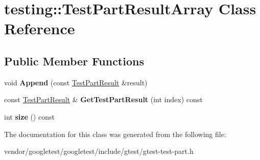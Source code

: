 \hypertarget{classtesting_1_1TestPartResultArray}{}\section{testing\+:\+:Test\+Part\+Result\+Array Class Reference}
\label{classtesting_1_1TestPartResultArray}
\subsection*{Public Member Functions}
\begin{DoxyCompactItemize}
\item 
void {\bfseries Append} (const \hyperlink{classtesting_1_1TestPartResult}{Test\+Part\+Result} \&result)\hypertarget{classtesting_1_1TestPartResultArray_a01844bd505b18a666324617a1b459558}{}\label{classtesting_1_1TestPartResultArray_a01844bd505b18a666324617a1b459558}

\item 
const \hyperlink{classtesting_1_1TestPartResult}{Test\+Part\+Result} \& {\bfseries Get\+Test\+Part\+Result} (int index) const \hypertarget{classtesting_1_1TestPartResultArray_a2b3dbf4012f204d916ce4a374bc03da4}{}\label{classtesting_1_1TestPartResultArray_a2b3dbf4012f204d916ce4a374bc03da4}

\item 
int {\bfseries size} () const \hypertarget{classtesting_1_1TestPartResultArray_acd805ad4edda06d983456b2a30760dce}{}\label{classtesting_1_1TestPartResultArray_acd805ad4edda06d983456b2a30760dce}

\end{DoxyCompactItemize}


The documentation for this class was generated from the following file\+:\begin{DoxyCompactItemize}
\item 
vendor/googletest/googletest/include/gtest/gtest-\/test-\/part.\+h\end{DoxyCompactItemize}
